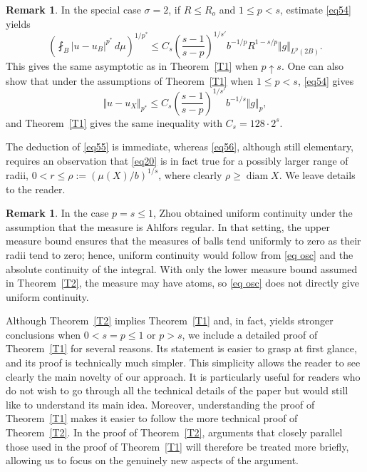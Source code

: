 \documentclass[12pt,leqno]{amsart}
\theoremstyle{definition}
\newtheorem{remark}[theorem]{Remark}
\def\diam{\operatorname{diam}}
\numberwithin{theorem}{section} \numberwithin{equation}{section}
\begin{document}
\begin{remark}
In the special case $\sigma=2$, if $R\leq R_o$ and $1\leq p<s$,
estimate \eqref{eq54} yields
\begin{equation}
\label{eq55}
\left(\fint_B |u-u_B|^{p^*}\, d\mu\right)^{1/p^*}\leq
C_s\left(\frac{s-1}{s-p}\right)^{1/s'} b^{-1/p} R^{1-s/p}\Vert g\Vert_{L^p(2B)}.
\end{equation}
This gives the same asymptotic as in Theorem~\ref{T1} when $p\uparrow s$. One can also show that under the assumptions of Theorem~\ref{T1} when $1\leq p<s$, \eqref{eq54} gives
\begin{equation}
\label{eq56}
\Vert u-u_X\Vert_{p^*}\leq C_s\left(\frac{s-1}{s-p}\right)^{1/s'}b^{-1/s}\Vert g\Vert_p,
\end{equation}
and Theorem~\ref{T1} gives the same inequality with $C_s=128\cdot 2^s$.

The deduction of \eqref{eq55} is immediate, whereas \eqref{eq56},
although still elementary, requires an observation  that \eqref{eq20} is in fact true for a possibly larger range of radii, $0<r\leq \rho:=(\mu(X)/b)^{1/s}$, where clearly $\rho\geq\diam X$. We leave details to the reader.
\end{remark}


\begin{remark}
In the case $p=s\leq1$, Zhou \cite{zhou} obtained uniform continuity under the assumption that the measure is Ahlfors regular. In that setting, the upper measure bound ensures that the measures of balls tend uniformly to zero as their radii tend to zero; hence, uniform continuity would follow from \eqref{eq osc} and the absolute continuity of the integral. With only the lower measure bound assumed in Theorem~\ref{T2}, the measure may have atoms, so \eqref{eq osc} does not directly give uniform continuity.
\end{remark}

Although Theorem~\ref{T2} implies Theorem~\ref{T1} and, in fact,
yields stronger conclusions when $0<s=p\leq1$ or $p>s$, we include
a detailed proof of Theorem~\ref{T1} for several reasons.
Its statement is easier to grasp at first glance, and its proof is technically much simpler. This simplicity allows the reader to see clearly the main novelty of our approach. It is particularly useful for readers who do not wish to go through all the technical details of the paper but would still like to understand its main idea. Moreover, understanding the proof of Theorem~\ref{T1} makes it easier to follow the more technical proof of Theorem~\ref{T2}. In the proof of Theorem~\ref{T2}, arguments that closely parallel those used in the proof of Theorem~\ref{T1} will therefore be treated more briefly, allowing us to focus on the genuinely new aspects of the argument.
\end{document}
